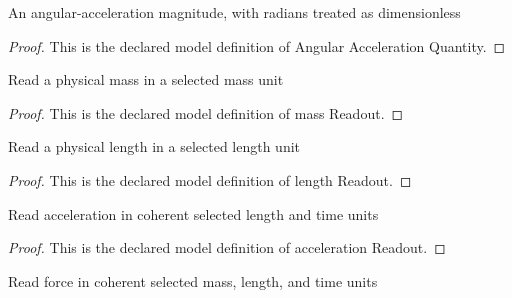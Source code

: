 \begin{definition}
  \label{def:physics:phyx-mini-0785:phyxminiproblems-problemphyxmini0785-angularaccelerationquantity}
  An angular-acceleration magnitude, with radians treated as dimensionless
\end{definition}
\begin{proof}
  This is the declared model definition of Angular Acceleration Quantity.
\end{proof}
\begin{definition}
  \label{def:physics:phyx-mini-0785:phyxminiproblems-problemphyxmini0785-massreadout}
  Read a physical mass in a selected mass unit
\end{definition}
\begin{proof}
  This is the declared model definition of mass Readout.
\end{proof}
\begin{definition}
  \label{def:physics:phyx-mini-0785:phyxminiproblems-problemphyxmini0785-lengthreadout}
  Read a physical length in a selected length unit
\end{definition}
\begin{proof}
  This is the declared model definition of length Readout.
\end{proof}
\begin{definition}
  \label{def:physics:phyx-mini-0785:phyxminiproblems-problemphyxmini0785-accelerationreadout}
  Read acceleration in coherent selected length and time units
\end{definition}
\begin{proof}
  This is the declared model definition of acceleration Readout.
\end{proof}
\begin{definition}
  \label{def:physics:phyx-mini-0785:phyxminiproblems-problemphyxmini0785-forcereadout}
  Read force in coherent selected mass, length, and time units
\end{definition}
